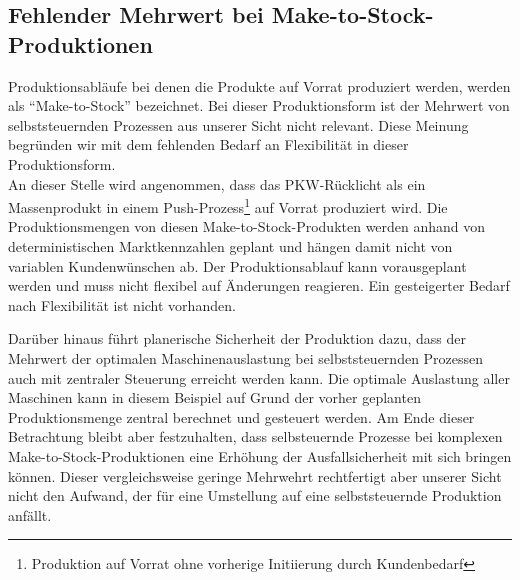 \subsection{Fehlender Mehrwert bei Make-to-Stock-Produktionen}
\label{sec:GrenzenMakeToStock}

Produktionsabläufe bei denen die Produkte auf Vorrat produziert werden, werden
als "`Make-to-Stock"' bezeichnet. Bei dieser Produktionsform ist der Mehrwert von
selbststeuernden Prozessen aus unserer Sicht nicht relevant. Diese Meinung
begründen wir mit dem fehlenden Bedarf an Flexibilität in dieser
Produktionsform.\hfill \\An dieser Stelle wird angenommen, dass das
PKW-Rücklicht als ein Massenprodukt in einem Push-Prozess\footnote{Produktion auf Vorrat ohne
vorherige Initiierung durch Kundenbedarf} auf Vorrat produziert wird. Die
Produktionsmengen von diesen Make-to-Stock-Produkten werden anhand von
deterministischen Marktkennzahlen geplant und hängen damit nicht von variablen
Kundenwünschen ab. Der Produktionsablauf kann vorausgeplant werden und muss
nicht flexibel auf Änderungen reagieren. Ein gesteigerter Bedarf nach
Flexibilität ist nicht vorhanden.

Darüber hinaus führt planerische Sicherheit der Produktion dazu, dass der
Mehrwert der optimalen Maschinenauslastung bei selbststeuernden Prozessen auch
mit zentraler Steuerung erreicht werden kann. Die optimale Auslastung aller
Maschinen kann in diesem Beispiel auf Grund der vorher geplanten
Produktionsmenge zentral berechnet und gesteuert werden.
\clearpage
Am Ende dieser Betrachtung bleibt aber festzuhalten, dass selbsteuernde
Prozesse bei komplexen Make-to-Stock-Produktionen eine Erhöhung der
Ausfallsicherheit mit sich bringen können. Dieser vergleichsweise geringe
Mehrwehrt rechtfertigt aber unserer Sicht nicht den Aufwand, der für eine
Umstellung auf eine selbststeuernde Produktion anfällt.
